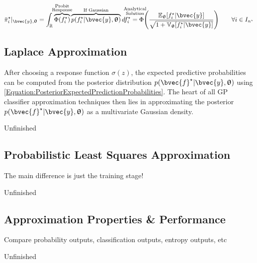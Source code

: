 			\begin{equation}
				 \bar{\pi}^{\star}_{i} |_{\bvec{y}, \vec{\uptheta}} = \int_{\mathbb{R}} \overbrace{\Phi(f^{\star}_{i})}^{\mathclap{\substack{\text{Probit} \\ \text{Response}}}} \overbrace{p(f^{\star}_{i} | \bvec{y}, \vec{\uptheta})}^{\text{If Gaussian}} d f^{\star}_{i} \stackrel{\mathclap{\substack{\text{Analytical} \\ \text{Solution} \\ \quad }}}{=} \Phi\Bigg(\frac{\mathbb{E}_{\vec{\uptheta}}[f^{\star}_{i} | \bvec{y}]}{\sqrt{1 + \mathbb{V}_{\vec{\uptheta}}[f^{\star}_{i} | \bvec{y}]}}\Bigg) \qquad \forall i \in I_{n^{\star}}
			\label{Equation:ProbitAnalyticalIntegral}
			\end{equation}
			
		\subsection{Laplace Approximation}
		\label{BenthicHabitatMapping:Classification:LaplaceApproximation}
		
			After choosing a response function $\sigma(z)$, the expected predictive probabilities can be computed from the posterior distribution $p(\bvec{f}^{\star} | \bvec{y}, \vec{\uptheta})$ using \eqref{Equation:PosteriorExpectedPredictionProbabilities}. The heart of all GP classifier approximation techniques then lies in approximating the posterior $p(\bvec{f}^{\star} | \bvec{y}, \vec{\uptheta})$ as a multivariate Gaussian density.
			
			Unfinished
			
		\subsection{Probabilistic Least Squares Approximation}
		\label{BenthicHabitatMapping:Classification:ProbabilisticLeastSquaresApproximation}
		
			The main difference is just the training stage!
			
			Unfinished
		\subsection{Approximation Properties \& Performance}
		\label{BenthicHabitatMapping:Classification:ApproximationPerformance}
		
			Compare probability outputs, classification outputs, entropy outputs, etc
		
			Unfinished
			
